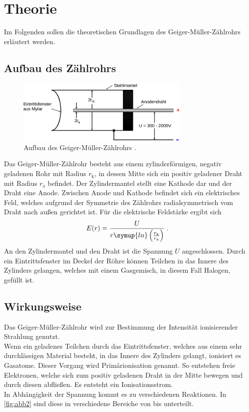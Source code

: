 \section{Theorie} \label{sec:Theorie}

Im Folgenden sollen die theoretischen Grundlagen des Geiger-Müller-Zählrohrs erläutert werden.

\subsection{Aufbau des Zählrohrs}

    \begin{figure}
      \centering
      \includegraphics[width=0.75\textwidth]{content/img/Abb_1.pdf}
      \caption{Aufbau des Geiger-Müller-Zählrohrs \cite{versuchsanleitung}.}
      \label{fig:abb1}
    \end{figure}

    Das Geiger-Müller-Zählrohr besteht aus einem zylinderförmigen, negativ geladenen Rohr mit Radius $r_\text{k}$,
    in dessen Mitte sich ein positiv geladener Draht mit Radius $r_\text{a}$ befindet.
    Der Zylindermantel stellt eine Kathode dar und der Draht eine Anode.
    Zwischen Anode und Kathode befindet sich ein elektrisches Feld,
    welches aufgrund der Symmetrie des Zählrohrs radialsymmetrisch vom Draht nach außen gerichtet ist.
    Für die elektrische Feldstärke ergibt sich
    \begin{equation}
        E(r) = \frac{U}{r \symup{ln}\left(\frac{r_\text{k}}{r_\text{a}}\right)} \; .
    \end{equation}
    An den Zylindermantel und den Draht ist die Spannung $U$ angeschlossen.
    Durch ein Eintrittsfenster im Deckel der Röhre können Teilchen in das Innere des Zylinders
    gelangen, welches mit einem Gasgemisch, in diesem Fall Halogen, gefüllt ist.

\subsection{Wirkungsweise}

    Das Geiger-Müller-Zählrohr wird zur Bestimmung der Intensität ionisierender Strahlung genutzt.\\
    Wenn ein geladenes Teilchen durch das Eintrittsfenster,
    welches aus einem sehr durchlässigen Material besteht,
    in das Innere des Zylinders gelangt, ionisiert es Gasatome.
    Dieser Vorgang wird Primärionisation genannt.
    So entstehen freie Elektronen,
    welche sich zum positiv geladenen Draht in der Mitte bewegen und durch diesen abfließen.
    Es entsteht ein Ionisationsstrom. \\
    In Abhängigkeit der Spannung kommt es zu verschiedenen Reaktionen.
    In \autoref{fig:abb2} sind diese in verschiedene Bereiche von  bis  unterteilt.\\

